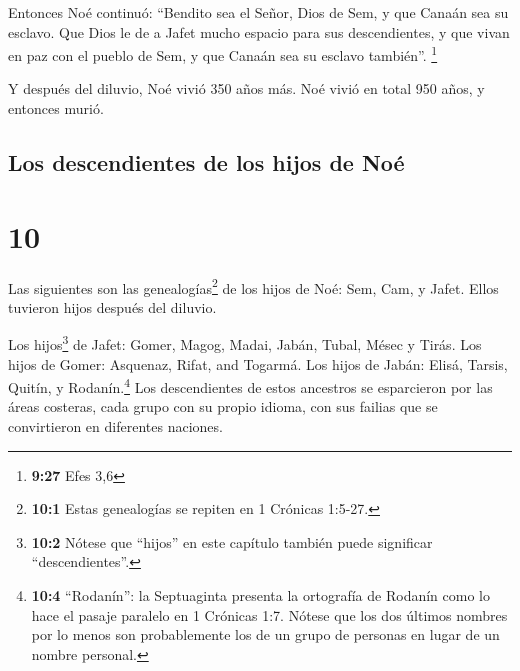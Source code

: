  Entonces Noé continuó: ``Bendito sea el Señor, Dios de
Sem, y que Canaán sea su esclavo.  Que Dios le de a Jafet
mucho espacio para sus descendientes, y que vivan en paz con el pueblo
de Sem, y que Canaán sea su esclavo también''. \footnote{\textbf{9:27}
  Efes 3,6}

 Y después del diluvio, Noé vivió 350 años más.
 Noé vivió en total 950 años, y entonces murió.

\hypertarget{los-descendientes-de-los-hijos-de-nouxe9}{%
\subsection{Los descendientes de los hijos de
Noé}\label{los-descendientes-de-los-hijos-de-nouxe9}}

\hypertarget{section-9}{%
\section{10}\label{section-9}}

 Las siguientes son las genealogías\footnote{\textbf{10:1}
  Estas genealogías se repiten en 1 Crónicas 1:5-27.} de los hijos de
Noé: Sem, Cam, y Jafet. Ellos tuvieron hijos después del diluvio.

 Los hijos\footnote{\textbf{10:2} Nótese que ``hijos'' en
  este capítulo también puede significar ``descendientes''.} de Jafet:
Gomer, Magog, Madai, Jabán, Tubal, Mésec y Tirás.  Los
hijos de Gomer: Asquenaz, Rifat, and Togarmá.  Los hijos
de Jabán: Elisá, Tarsis, Quitín, y Rodanín.\footnote{\textbf{10:4}
  ``Rodanín'': la Septuaginta presenta la ortografía de Rodanín como lo
  hace el pasaje paralelo en 1 Crónicas 1:7. Nótese que los dos últimos
  nombres por lo menos son probablemente los de un grupo de personas en
  lugar de un nombre personal.}  Los descendientes de
estos ancestros se esparcieron por las áreas costeras, cada grupo con su
propio idioma, con sus failias que se convirtieron en diferentes
naciones.

